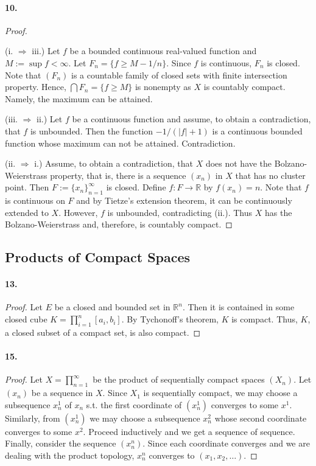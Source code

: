 \paragraph{10.}
\begin{proof}
  $\,$\par
  (i. $\Rightarrow$ iii.) Let $f$ be a bounded continuous real-valued function
  and $M := \sup f < \infty$. Let $F_n = \{f \ge M - 1/n\}$. Since $f$ is
  continuous, $F_n$ is closed. Note that $(F_n)$ is a countable family of
  closed sets with finite intersection property. Hence, $\bigcap F_n =
  \{f \ge M\}$ is nonempty as $X$ is countably compact. Namely, the maximum
  can be attained. 
  
  (iii. $\Rightarrow$ ii.) Let $f$ be a continuous function and assume, to
  obtain a contradiction, that $f$ is unbounded. Then the function 
  $-1/(|f| + 1)$ is a continuous bounded function whose maximum can not be 
  attained. Contradiction.
  
  (ii. $\Rightarrow$ i.) Assume, to obtain a contradiction, that $X$ does not
  have the Bolzano-Weierstrass property, that is, there is a sequence $(x_n)$
  in $X$ that has no cluster point. Then $F := \{x_n\}_{n=1}^\infty$ is closed.
  Define $f: F \to \mathbb{R}$ by $f(x_n) = n$. Note that $f$ is continuous on
  $F$ and by Tietze's extension theorem, it can be continuously extended to 
  $X$. However, $f$ is unbounded, contradicting (ii.). Thus $X$ has the
  Bolzano-Weierstrass and, therefore, is countably compact. 
\end{proof}

\subsection{Products of Compact Spaces}
\paragraph{13.}
\begin{proof}
  Let $E$ be a closed and bounded set in $\mathbb{R}^n$. Then it is contained
  in some closed cube $K = \prod_{i=1}^n[a_i, b_i]$. By Tychonoff's theorem,
  $K$ is compact. Thus, $K$, a closed subset of a compact set, is also compact.
\end{proof}

\paragraph{15.}
\begin{proof}
  Let $X = \prod_{n=1}^\infty$ be the product of sequentially compact spaces
  $(X_n)$. Let $(x_n)$ be a sequence in $X$. Since $X_1$ is sequentially
  compact, we may choose a subsequence $x_n^1$ of $x_n$ s.t. the first
  coordinate of $(x_n^1)$ converges to some $x^1$. Similarly, from $(x_n^1)$ we
  may choose a subsequence $x_n^2$ whose second coordinate converges to some
  $x^2$. Proceed inductively and we get a sequence of sequence. Finally,
  consider the sequence $(x_n^n)$. Since each coordinate converges and we are
  dealing with the product topology, $x_n^n$ converges to $(x_1, x_2, \dots)$.
\end{proof}


